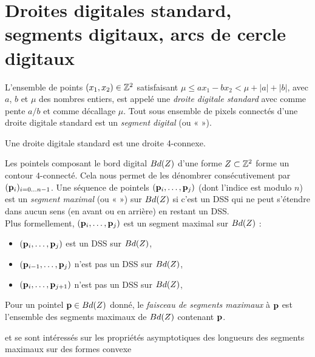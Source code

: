 \section{Droites digitales standard, segments digitaux, arcs de cercle digitaux}%
\label{sec:segments}
%
\begin{definition}{}
  \label{def:DSS}
%
  L'ensemble de points $(x_1,x_2) \in \mathbb{Z}^2$ satisfaisant $\mu \le ax_1 - bx_2 <
  \mu + |a| + |b|$, avec $a$, $b$ et $\mu$ des nombres entiers, est appelé une
  \emph{droite digitale standard} avec comme pente $a/b$ et comme décallage
  $\mu$. Tout sous ensemble de pixels connectés d'une droite digitale standard
  est un \emph{segment digital} (ou «  »).
%
\end{definition}
%
Une droite digitale standard est une droite 4-connexe.
%
\begin{definition}{}
  \label{def:MDSS}
%
  Les pointels composant le bord digital $Bd({Z})$ d'une forme
  $Z \subset \mathbb{Z}^2$ forme un contour $4$-connecté. Cela nous permet de
  les dénombrer consécutivement par $(\mathbf{p}_i)_{i={0\ldots n-1}}$. Une séquence de
  pointels $(\mathbf{p}_i, \ldots, \mathbf{p}_j)$ (dont l'indice est modulo $n$) est un
  \emph{segment maximal} (ou «  ») sur $Bd({Z})$ si c'est
  un DSS qui ne peut s'étendre dans aucun sens (en avant ou en arrière) en
  restant un DSS.
  \\
  Plus formellement, $(\mathbf{p}_i, \ldots, \mathbf{p}_j)$ est un segment maximal sur $Bd({Z})$ \ssi :
  \begin{itemize}
    \item $(\mathbf{p}_i, \ldots, \mathbf{p}_j)$ est un DSS sur $Bd({Z})$,
    \item $(\mathbf{p}_{i-1}, \ldots, \mathbf{p}_j)$ n'est pas un DSS sur $Bd({Z})$,
    \item $(\mathbf{p}_i, \ldots, \mathbf{p}_{j+1})$ n'est pas un DSS sur $Bd({Z})$,
  \end{itemize}
  Pour un pointel $\mathbf{p} \in Bd({Z})$ donné, le \emph{faisceau de segments maximaux} à $\mathbf{p}$ est l'ensemble
  des segments maximaux de $Bd({Z})$ contenant $\mathbf{p}$.
%
\end{definition}
%
 et  se sont intéressés sur les propriétés
asymptotiques des longueurs des segments maximaux sur des formes convexe
